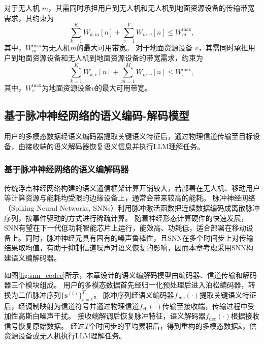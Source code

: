 对于无人机 $m$，其需同时承担用户到无人机和无人机到地面资源设备的传输带宽需求，其约束为
\begin{equation}
\sum_{k=1}^{K} W_{k,m}[n] + \sum_{v=1}^{V} W_{m,v}[n] \le W_{m}^{\max},
\end{equation}
其中，$W_{m}^{\max}$为无人机$m$的最大可用带宽。
对于地面资源设备 $v$，其需同时承担用户到地面资源设备和无人机到地面资源设备的带宽需求，约束为
\begin{equation}
\sum_{k=1}^{K} W_{k,v}[n] + \sum_{m=1}^{M} W_{m,v}[n] \le W_{v}^{\max},
\end{equation}
其中，$W_{v}^{\max}$为地面资源设备$v$的最大可用带宽。


\subsection{基于脉冲神经网络的语义编码-解码模型}
用户的多模态数据经语义编码器提取关键语义特征后，通过物理信道传输至目标设备，由接收端的语义解码器恢复语义信息并执行LLM理解任务。

\subsubsection{基于脉冲神经网络的语义编解码器}
传统浮点神经网络构建的语义通信框架计算开销较大，若部署在无人机、移动用户等计算资源与能耗均受限的边缘设备上，通常会带来较高的能耗。
脉冲神经网络（Spiking Neural Networks, SNNs）利用脉冲激活函数把连续数据编码成离散脉冲序列，按事件驱动的方式进行稀疏计算。
随着神经形态计算硬件的快速发展，SNN有望在下一代低功耗智能芯片上运行，能效高、功耗低，适合部署在移动设备上\supercite{rathi2023exploring,basu2022spiking}。同时，脉冲神经元具有固有的噪声鲁棒性\supercite{xu2024feel}，且SNN在多个时间步上对传输结果取均值，有助于抑制信道噪声对语义恢复的影响，因而本章考虑采用SNN构建语义编解码器。

如图\ref{fig:snn_codec}所示，本章设计的语义编解码模型由编码器、信道传输和解码器三个模块组成。
用户的多模态数据首先经归一化预处理后进入泊松编码器，转换为二值脉冲序列$\{\mathbf{s}^{(t)}\}_{t=1}^{T}$。
脉冲序列经语义编码器$f_{\text{enc}}(\cdot)$提取关键语义特征后，经调制映射为信道符号并通过物理信道$f_{\text{ch}}(\cdot)$传输至接收端，传输过程中受加性高斯白噪声干扰。
接收端解调后恢复脉冲特征，语义解码器$f_{\text{dec}}(\cdot)$根据接收信号恢复原始数据。
经过$T$个时间步的平均累积后，得到重构的多模态数据$\hat{\mathbf{x}}$，供资源设备或无人机执行LLM理解任务。

